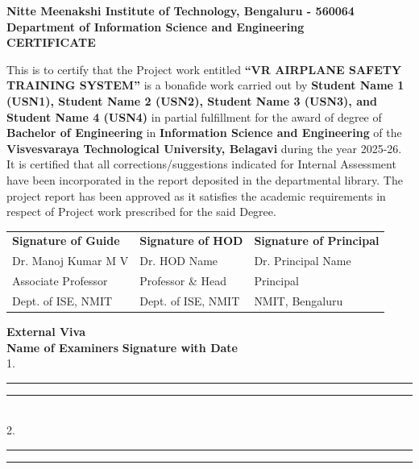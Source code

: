 \begin{center}
	\thispagestyle{empty}
	\large \textbf{Nitte Meenakshi Institute of Technology, Bengaluru - 560064}\\
	\large \textbf{Department of Information Science and Engineering}\\
	\vspace{0.5cm}
	\vspace{0.5cm}
	\large \textbf{CERTIFICATE}\\
\end{center}
\vspace{0.2cm}
\linespread{1.5}
\noindent
This is to certify that the Project work entitled \textbf{\enquote{VR AIRPLANE SAFETY TRAINING SYSTEM}} is a bonafide work carried out by \textbf{Student Name 1 (USN1), Student Name 2 (USN2), Student Name 3 (USN3), and Student Name 4 (USN4)} in partial fulfillment for the award of degree of \textbf{Bachelor of Engineering} in \textbf{Information Science and Engineering} of the \textbf{Visvesvaraya Technological University, Belagavi} during the year 2025-26. It is certified that all corrections/suggestions indicated for Internal Assessment have been incorporated in the report deposited in the departmental library. The project report has been approved as it satisfies the academic requirements in respect of Project work prescribed for the said Degree.

\vspace{2.0cm}

\begin{table}[h]
	\centering
	\begin{tabular}{p{5cm} p{5cm} p{5cm}}
		\textbf{Signature of Guide} & \textbf{Signature of HOD} & \textbf{Signature of Principal} \\
		Dr. Manoj Kumar M V & Dr. HOD Name & Dr. Principal Name \\
		Associate Professor & Professor \& Head & Principal \\
		Dept. of ISE, NMIT & Dept. of ISE, NMIT & NMIT, Bengaluru
	\end{tabular}
\end{table}

\vspace{1.0cm}
\noindent
\textbf{External Viva}\\
\textbf{Name of Examiners} \hfill \textbf{Signature with Date}\\
1. \rule{6cm}{0.5pt} \hfill \rule{4cm}{0.5pt}\\
2. \rule{6cm}{0.5pt} \hfill \rule{4cm}{0.5pt}\\
